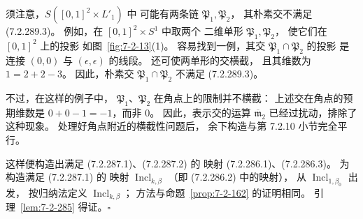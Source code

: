 须注意，$S([0,1]^2\times L'_1)$ 中
可能有两条链 $\mathfrak P_1,\mathfrak P_2$，
其朴素交不满足 (7.2.289.3)。
例如，在 $[0,1]^2\times S^1$ 中取两个
二维单形 $\mathfrak P_1,\mathfrak P_2$，
使它们在 $[0,1]^2$ 上的投影
如图~\ref{fig:7-2-13}(1)。
容易找到一例，其交
$\mathfrak P_1\cap\mathfrak P_2$ 的投影
是连接 $(0,0)$ 与 $(\epsilon,\epsilon)$ 的线段。
还可使两单形的交横截，
且其维数为 $1=2+2-3$。
因此，朴素交
$\mathfrak P_1\cap\mathfrak P_2$
不满足 (7.2.289.3)。

不过，在这样的例子中，
$\mathfrak P_1$、$\mathfrak P_2$
在角点上的限制并不横截：
上述交在角点的预期维数是
$0+0-1=-1$，而非 $0$。
因此，表示交的运算 $\overline{\mathfrak m}_2$
已经过扰动，排除了这种现象。
处理好角点附近的横截性问题后，
余下构造与第 7.2.10 小节完全平行。

这样便构造出满足
(7.2.287.1)、(7.2.287.2) 的
映射 (7.2.286.1)、(7.2.286.3)。
为构造满足 (7.2.287.1) 的
映射 $\operatorname{Incl}_{k,\beta}$
（即 (7.2.286.2) 中的映射），
从 $\operatorname{Incl}_{1,\beta_0}$ 出发，
按归纳法定义 $\operatorname{Incl}_{k,\beta}$；
方法与命题~\ref{prop:7-2-162} 的证明相同。
引理~\ref{lem:7-2-285} 得证。$\square$
